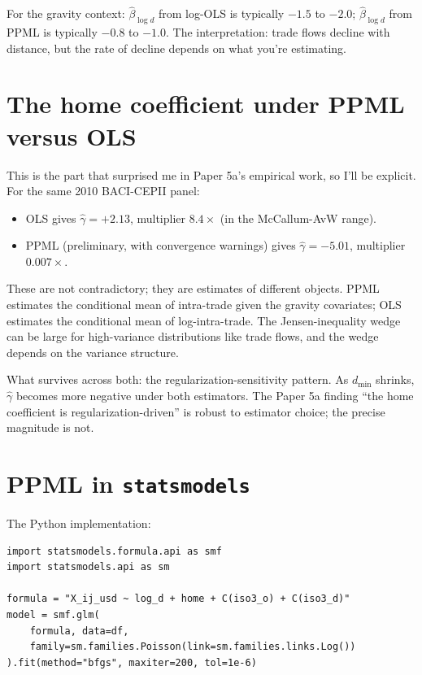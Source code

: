 \documentclass[11pt,letterpaper,oneside]{book}
\theoremstyle{definition}
\theoremstyle{remark}
\begin{document}
For the gravity context: $\hat{\beta}_{\log d}$ from log-OLS is
typically $-1.5$ to $-2.0$; $\hat{\beta}_{\log d}$ from PPML is
typically $-0.8$ to $-1.0$. The interpretation: trade flows decline
with distance, but the rate of decline depends on what you're
estimating.

\section{The home coefficient under PPML versus OLS}

This is the part that surprised me in Paper 5a's empirical work, so
I'll be explicit. For the same 2010 BACI-CEPII panel:
\begin{itemize}
  \item OLS gives $\hat{\gamma} = +2.13$, multiplier $8.4\times$
    (in the McCallum-AvW range).
  \item PPML (preliminary, with convergence warnings) gives
    $\hat{\gamma} = -5.01$, multiplier $0.007\times$.
\end{itemize}

These are not contradictory; they are estimates of different objects.
PPML estimates the conditional mean of intra-trade given the gravity
covariates; OLS estimates the conditional mean of log-intra-trade.
The Jensen-inequality wedge can be large for high-variance distributions
like trade flows, and the wedge depends on the variance structure.

What survives across both: the regularization-sensitivity pattern. As
$d_{\min}$ shrinks, $\hat{\gamma}$ becomes more negative under both
estimators. The Paper 5a finding ``the home coefficient is regularization-driven''
is robust to estimator choice; the precise magnitude is not.

\section{PPML in \texttt{statsmodels}}

The Python implementation:
\begin{lstlisting}
import statsmodels.formula.api as smf
import statsmodels.api as sm

formula = "X_ij_usd ~ log_d + home + C(iso3_o) + C(iso3_d)"
model = smf.glm(
    formula, data=df,
    family=sm.families.Poisson(link=sm.families.links.Log())
).fit(method="bfgs", maxiter=200, tol=1e-6)
\end{lstlisting}
\end{document}
